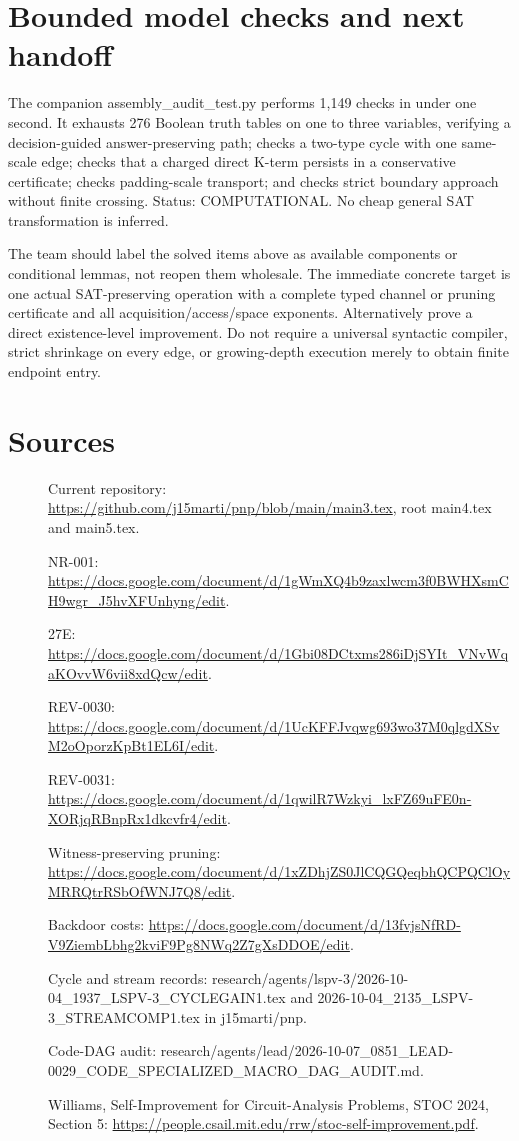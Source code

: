 \documentclass[11pt]{article}
\begin{document}
\section{Bounded model checks and next handoff}
The companion assembly\_audit\_test.py performs 1,149 checks in under one second. It exhausts 276 Boolean truth tables on one to three variables, verifying a decision-guided answer-preserving path; checks a two-type cycle with one same-scale edge; checks that a charged direct K-term persists in a conservative certificate; checks padding-scale transport; and checks strict boundary approach without finite crossing. Status: COMPUTATIONAL. No cheap general SAT transformation is inferred.

The team should label the solved items above as available components or conditional lemmas, not reopen them wholesale. The immediate concrete target is one actual SAT-preserving operation with a complete typed channel or pruning certificate and all acquisition/access/space exponents. Alternatively prove a direct existence-level improvement. Do not require a universal syntactic compiler, strict shrinkage on every edge, or growing-depth execution merely to obtain finite endpoint entry.

\section{Sources}
\begin{description}
\item[] Current repository: \url{https://github.com/j15marti/pnp/blob/main/main3.tex}, root main4.tex and main5.tex.
\item[] NR-001: \url{https://docs.google.com/document/d/1gWmXQ4b9zaxlwcm3f0BWHXsmCH9wgr_J5hvXFUnhyng/edit}.
\item[] 27E: \url{https://docs.google.com/document/d/1Gbi08DCtxms286iDjSYIt_VNvWqaKOvvW6vii8xdQcw/edit}.
\item[] REV-0030: \url{https://docs.google.com/document/d/1UcKFFJvqwg693wo37M0qlgdXSvM2oOporzKpBt1EL6I/edit}.
\item[] REV-0031: \url{https://docs.google.com/document/d/1qwilR7Wzkyi_lxFZ69uFE0n-XORjqRBnpRx1dkcvfr4/edit}.
\item[] Witness-preserving pruning: \url{https://docs.google.com/document/d/1xZDhjZS0JlCQGQeqbhQCPQClOyMRRQtrRSbOfWNJ7Q8/edit}.
\item[] Backdoor costs: \url{https://docs.google.com/document/d/13fvjsNfRD-V9ZiembLbhg2kviF9Pg8NWq2Z7gXsDDOE/edit}.
\item[] Cycle and stream records: research/agents/lspv-3/2026-10-04\_1937\_LSPV-3\_CYCLEGAIN1.tex and 2026-10-04\_2135\_LSPV-3\_STREAMCOMP1.tex in j15marti/pnp.
\item[] Code-DAG audit: research/agents/lead/2026-10-07\_0851\_LEAD-0029\_CODE\_SPECIALIZED\_MACRO\_DAG\_AUDIT.md.
\item[] Williams, Self-Improvement for Circuit-Analysis Problems, STOC 2024, Section 5: \url{https://people.csail.mit.edu/rrw/stoc-self-improvement.pdf}.
\end{description}
\end{document}
